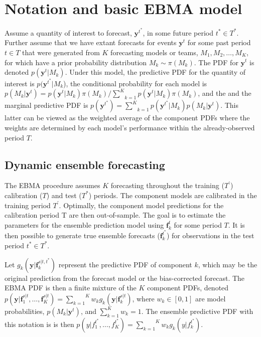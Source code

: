 \documentclass[12pt,fullpage,endnotes]{article}
\begin{document}
\section{Notation and basic EBMA model} 
\label{model}

Assume a quantity of interest to forecast, $\mathbf{y}^{t^*}$, in some
future period $t^\ast \in T^\ast$.  Further assume that we have extant
forecasts for events $\mathbf{y}^t$ for some past period $t \in T$
that were generated from $K$ forecasting models or teams, $M_1, M_2,
\ldots, M_K$, for which have a prior probability distribution $M_k\sim
\pi(M_k)$. The PDF for $\mathbf{y}^t$ is denoted
$p(\mathbf{y}^t|M_k)$.  Under this model, the predictive PDF for the
quantity of interest is $p(\mathbf{y}^{t^*}|M_k$), the conditional
probability for each model is $p(M_k|\mathbf{y}^t) =
p(\mathbf{y}^t|M_k)\pi(M_k)/\underset{k=1}{\overset{K}{\sum}}p(\mathbf{y}^t|M_k)\pi(M_k)$,
and the and the marginal predictive PDF is $p(\mathbf{y}^{t^*}) =
\underset{k=1}{\overset{K}{\sum}}
p(\mathbf{y}^{t^*}|M_k)p(M_k|\mathbf{y}^{t})$.  This latter can be
viewed as the weighted average of the component PDFs where the weights
are determined by each model's performance within the already-observed
period $T$.

\subsection{Dynamic ensemble forecasting}

The EBMA procedure assumes $K$ forecasting throughout the training
($T^{\prime}$) calibration ($T$) and test ($T^\ast$) periods. The
component models are calibrated in the training period
$T^\prime$. Optimally, the component model predictions for the
calibration period T are then out-of-sample. The goal is to estimate
the parameters for the ensemble prediction model using
$\mathbf{f}^{t}_k$ for some period $T$.  It is then possible to
generate true ensemble forecasts ($\mathbf{f}_k^{t^\ast}$) for
observations in the test period $t^\ast \in T^*$.

Let $g_k(\mathbf{y}|\mathbf{f}_k^{s|t, t^\ast})$ represent the
predictive PDF of component $k$, which may be the original prediction
from the forecast model or the bias-corrected forecast.  The EBMA PDF
is then a finite mixture of the $K$ component PDFs, denoted
$p(\mathbf{y}|\mathbf{f}_1^{s|t}, \ldots,
\mathbf{f}_K^{s|t})=\overset{K}{\underset{k=1}{\sum}} w_k
g_k(\mathbf{y}|\mathbf{f}_k^{s|t})$, where $w_k \in [0,1]$ are model
probabilities, $p(M_k|\mathbf{y}^t)$, and $\sum_{k=1}^Kw_k=1$. The
ensemble predictive PDF with this notation is is then
$p(y|f_{1}^{t^\ast}, \ldots,
f_{K}^{t^\ast})=\overset{K}{\underset{k=1}{\sum}} w_k
g_k(y|f_{k}^{t^*})$.
\end{document}
